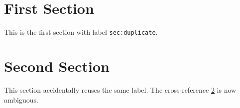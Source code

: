 \documentclass{article}
\begin{document}
\section{First Section}
\label{sec:duplicate}

This is the first section with label \texttt{sec:duplicate}.

\section{Second Section}
\label{sec:duplicate}

This section accidentally reuses the same label.
The cross-reference \ref{sec:duplicate} is now ambiguous.
\end{document}
